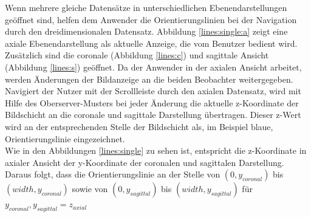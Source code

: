Wenn mehrere gleiche Datensätze in unterschiedlichen Ebenendarstellungen geöffnet sind, helfen dem Anwender die Orientierungslinien bei der Navigation durch den dreidimensionalen Datensatz. Abbildung \ref{lines:single:a} zeigt eine axiale Ebenendarstellung als aktuelle Anzeige, die vom Benutzer bedient wird. Zusätzlich sind die coronale (Abbildung \ref{lines:c}) und sagittale Ansicht (Abbildung \ref{lines:s}) geöffnet. Da der Anwender in der axialen Ansicht arbeitet, werden Änderungen der Bildanzeige an die beiden Beobachter weitergegeben.\\
Navigiert der Nutzer mit der Scrollleiste durch den axialen Datensatz, wird mit Hilfe des Oberserver-Musters bei jeder Änderung die aktuelle z-Koordinate der Bildschicht an die coronale und sagittale Darstellung übertragen. Dieser z-Wert wird an der entsprechenden Stelle der Bildschicht als, im Beispiel blaue, Orientierungslinie eingezeichnet. \\
Wie in den Abbildungen \ref{lines:single} zu sehen ist, entspricht die z-Koordinate in axialer Ansicht der y-Koordinate der coronalen und sagittalen Darstellung. Daraus folgt, dass die Orientierungslinie an der Stelle von $(0, y_{coronal}) $ bis $(width, y_{coronal})$ sowie von $(0, y_{sagittal}) $ bis $(width, y_{sagittal})$ für $y_{coronal}, y_{sagittal} = z_{axial}$

